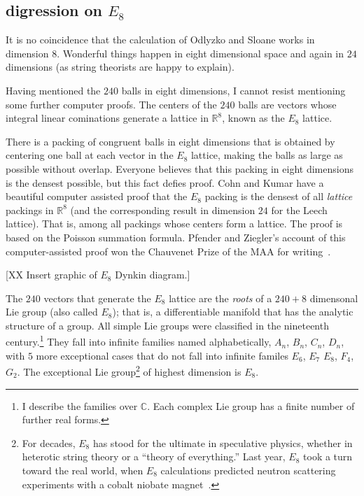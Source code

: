 \documentclass{llncs}
\newcommand{\ring}[1]{\mathbb{#1}}
\begin{document}
\subsection{digression on $E_8$}

It is no coincidence that the calculation of Odlyzko and Sloane works
in dimension $8$.  Wonderful things happen in eight dimensional space
and again in $24$ dimensions (as string theorists are happy to
explain).

Having mentioned the $240$ balls in eight dimensions, I cannot resist
mentioning some further computer proofs.  The centers of the $240$ balls
are vectors whose integral linear cominations generate 
a lattice in $\ring{R}^8$, known as the $E_8$ lattice.

There is a packing of congruent balls in eight dimensions that is
obtained by centering one ball at each vector in the $E_8$ lattice,
making the balls as large as possible without overlap.  Everyone
believes that this packing in eight dimensions is the densest
possible, but this fact defies proof.  Cohn and Kumar have a beautiful
computer assisted proof that the $E_8$ packing is the densest of all
{\it lattice} packings in $\ring{R}^8$ (and the corresponding result in
dimension $24$ for the Leech lattice).  That is, among all packings
whose centers form a lattice.  The proof is based on the Poisson
summation formula.  Pfender and Ziegler's account of this
computer-assisted proof won the Chauvenet Prize of the MAA for
writing~\cite{PZ}.


[XX Insert graphic of $E_8$ Dynkin diagram.]

The $240$ vectors that generate the $E_8$ lattice are the {\it roots}
of a $240+8$ dimensonal Lie group (also called $E_8$); that is, a
differentiable manifold that has the analytic structure of a group.
All simple Lie groups were classified in the nineteenth
century.\footnote{I describe the families over $\ring{C}$.  Each
  complex Lie group has a finite number of further real forms.}  They
fall into infinite families named alphabetically, $A_n$, $B_n$, $C_n$,
$D_n$, with $5$ more exceptional cases that do not fall into infinite
familes $E_6$, $E_7$ $E_8$, $F_4$, $G_2$.  The exceptional Lie
group\footnote{For decades, $E_8$ has stood for the ultimate in
  speculative physics, whether in heterotic string theory or a
  ``theory of everything.''  Last year, $E_8$ took a turn toward the
  real world, when $E_8$ calculations predicted neutron scattering
  experiments with a cobalt niobate magnet~\cite{BGE8}.} of highest
dimension is $E_8$.
\end{document}
